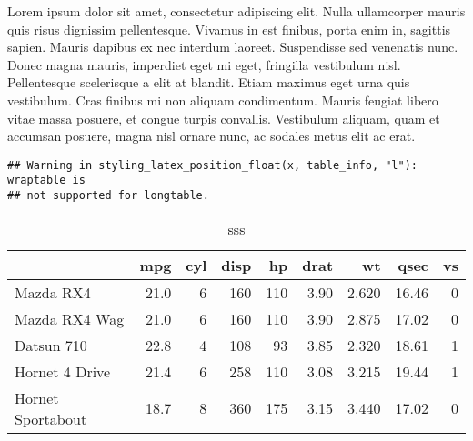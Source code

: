 \documentclass[]{article}
\newenvironment{Shaded}{\begin{snugshade}}{\end{snugshade}}
\newcommand{\KeywordTok}[1]{\textcolor[rgb]{0.13,0.29,0.53}{\textbf{{#1}}}}
\newcommand{\DataTypeTok}[1]{\textcolor[rgb]{0.13,0.29,0.53}{{#1}}}
\newcommand{\DecValTok}[1]{\textcolor[rgb]{0.00,0.00,0.81}{{#1}}}
\newcommand{\StringTok}[1]{\textcolor[rgb]{0.31,0.60,0.02}{{#1}}}
\newcommand{\NormalTok}[1]{{#1}}
\begin{document}
Lorem ipsum dolor sit amet, consectetur adipiscing elit. Nulla
ullamcorper mauris quis risus dignissim pellentesque. Vivamus in est
finibus, porta enim in, sagittis sapien. Mauris dapibus ex nec interdum
laoreet. Suspendisse sed venenatis nunc. Donec magna mauris, imperdiet
eget mi eget, fringilla vestibulum nisl. Pellentesque scelerisque a elit
at blandit. Etiam maximus eget urna quis vestibulum. Cras finibus mi non
aliquam condimentum. Mauris feugiat libero vitae massa posuere, et
congue turpis convallis. Vestibulum aliquam, quam et accumsan posuere,
magna nisl ornare nunc, ac sodales metus elit ac erat.

\begin{Shaded}
\end{Shaded}

\begin{verbatim}
## Warning in styling_latex_position_float(x, table_info, "l"): wraptable is
## not supported for longtable.
\end{verbatim}

\begingroup\fontsize{6}{8}\selectfont
{}

\begin{longtable}[l]{lrrrrrrrr}
\caption{\label{tab:unnamed-chunk-7}sss}\\
\toprule
  & mpg & cyl & disp & hp & drat & wt & qsec & vs\\
\midrule
Mazda RX4 & 21.0 & 6 & 160 & 110 & 3.90 & 2.620 & 16.46 & 0\\
Mazda RX4 Wag & 21.0 & 6 & 160 & 110 & 3.90 & 2.875 & 17.02 & 0\\
Datsun 710 & 22.8 & 4 & 108 & 93 & 3.85 & 2.320 & 18.61 & 1\\
Hornet 4 Drive & 21.4 & 6 & 258 & 110 & 3.08 & 3.215 & 19.44 & 1\\
Hornet Sportabout & 18.7 & 8 & 360 & 175 & 3.15 & 3.440 & 17.02 & 0\\
\bottomrule
\end{longtable}
\end{document}

